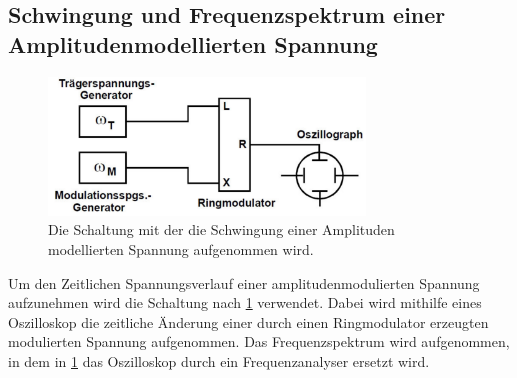 \subsection{Schwingung und Frequenzspektrum einer Amplitudenmodellierten Spannung}
\begin{figure}[h!]
	\centering
	\includegraphics[width = 0.75\textwidth]{../Grafiken/Versuchsaufbau_a.pdf}
	\caption{Die Schaltung mit der die Schwingung einer Amplituden modellierten Spannung aufgenommen wird.\cite{V59}\label{fig:Aufbau_a}}
\end{figure}
Um den Zeitlichen Spannungsverlauf einer amplitudenmodulierten Spannung aufzunehmen wird die Schaltung nach \cref{fig:Aufbau_a} verwendet.
Dabei wird mithilfe eines Oszilloskop die zeitliche Änderung einer durch einen Ringmodulator erzeugten modulierten Spannung aufgenommen.
Das Frequenzspektrum wird aufgenommen, in dem in \cref{fig:Aufbau_a} das Oszilloskop durch ein Frequenzanalyser ersetzt wird.

\newpage
